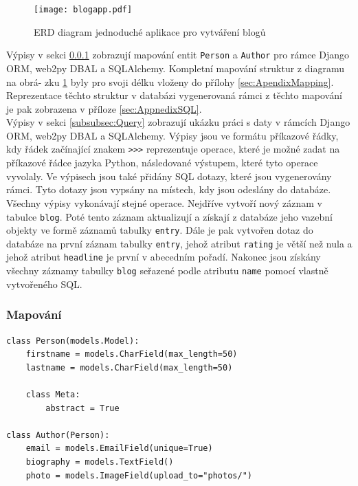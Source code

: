 \documentclass[ing,male,java,dept456]{diploma}						%
\begin{document}
\begin{figure}[h!]
    \centering
    \texttt{[image: blogapp.pdf]}
    \caption{ERD diagram jednoduché aplikace pro vytváření blogů}
    \label{fig:BlogappErd}
\end{figure}

Výpisy v sekci \ref{subsubsec:Mapping} zobrazují mapování entit \lstinline[style=inlinepython]|Person| a \lstinline[style=inlinepython]|Author| pro rámce Django ORM, web2py DBAL a SQLAlchemy. Kompletní mapování struktur z diagramu na obrá- zku \ref{fig:BlogappErd} byly pro svoji délku vloženy do přílohy \ref{sec:ApendixMapping}. Reprezentace těchto struktur v databázi vygenerovaná rámci z těchto mapování je pak zobrazena v příloze \ref{sec:AppnedixSQL}. \\
Výpisy v sekci \ref{subsubsec:Query} zobrazují ukázku práci s daty v rámcích Django ORM, web2py DBAL a SQLAlchemy. Výpisy jsou ve formátu příkazové řádky, kdy řádek začínající znakem \lstinline[style=inlinepython]|>>>| reprezentuje operace, které je možné zadat na příkazové řádce jazyka Python, následované výstupem, které tyto operace vyvolaly. Ve výpisech jsou také přidány SQL dotazy, které jsou vygenerovány rámci. Tyto dotazy jsou vypsány na místech, kdy jsou odeslány do databáze. \\
Všechny výpisy vykonávají stejné operace. Nejdříve vytvoří nový záznam v tabulce \lstinline[style=inlinepython]|blog|. Poté tento záznam aktualizují a získají z databáze jeho vazební objekty ve formě záznamů tabulky \lstinline[style=inlinepython]|entry|. Dále je pak vytvořen dotaz do databáze na první záznam tabulky \lstinline[style=inlinepython]|entry|, jehož atribut \lstinline[style=inlinepython]|rating| je větší než nula a jehož atribut \lstinline[style=inlinepython]|headline| je první v abecedním pořadí. Nakonec jsou získány všechny záznamy tabulky \lstinline[style=inlinepython]|blog| seřazené podle atributu \lstinline[style=inlinepython]|name| pomocí vlastně vytvořeného SQL.

\subsubsection{Mapování}
\label{subsubsec:Mapping}
\begin{lstlisting}[style=custompython, emphstyle={\bfseries}, label=src:Light-Mapping, caption=Ukázka mapování v Django ORM]
class Person(models.Model):
    firstname = models.CharField(max_length=50)
    lastname = models.CharField(max_length=50)

    class Meta:
        abstract = True
        
class Author(Person):
    email = models.EmailField(unique=True)
    biography = models.TextField()
    photo = models.ImageField(upload_to="photos/")
\end{lstlisting}
\end{document}
